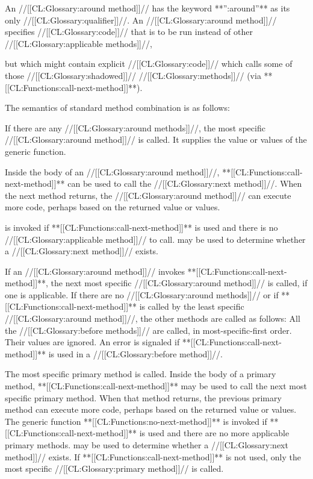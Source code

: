 \itemitem{\bull}
An //[[CL:Glossary:around method]]// has the keyword **'':around''** as its only //[[CL:Glossary:qualifier]]//.
An //[[CL:Glossary:around method]]// specifies //[[CL:Glossary:code]]// that is to be run instead of other
//[[CL:Glossary:applicable methods]]//,


but which might contain explicit //[[CL:Glossary:code]]//
which calls some of those //[[CL:Glossary:shadowed]]// //[[CL:Glossary:methods]]//
(via **[[CL:Functions:call-next-method]]**).

\endlist

The semantics of standard method combination is as follows:

\beginlist
                               
\itemitem{\bull} If there are any //[[CL:Glossary:around methods]]//, the most specific
//[[CL:Glossary:around method]]// is called.  It supplies the value or values of the
generic function.

\itemitem{\bull} Inside the body of an //[[CL:Glossary:around method]]//, 
**[[CL:Functions:call-next-method]]** can be used to call the //[[CL:Glossary:next method]]//.  When the next
method returns, the //[[CL:Glossary:around method]]// can execute more code,
perhaps based on the returned value or values.



 is invoked if **[[CL:Functions:call-next-method]]** is used and
there is no //[[CL:Glossary:applicable method]]// to call.  
may be used to determine whether a //[[CL:Glossary:next method]]// exists.

\itemitem{\bull} 
If an //[[CL:Glossary:around method]]// invokes **[[CL:Functions:call-next-method]]**,
the next most specific //[[CL:Glossary:around method]]//
is called, if one is applicable.  If there are no //[[CL:Glossary:around methods]]// 
or if **[[CL:Functions:call-next-method]]** is called by the least
specific //[[CL:Glossary:around method]]//, the other methods are called as
follows:
\beginlist
\itemitem{--} All the //[[CL:Glossary:before methods]]// are called, in
most-specific-first order.  Their values are ignored.
An error is signaled if **[[CL:Functions:call-next-method]]** is used in a
//[[CL:Glossary:before method]]//.

\itemitem{--} The most specific primary method is called.  Inside the
body of a primary method, **[[CL:Functions:call-next-method]]** may be used to call
the next most specific primary method.  When that method returns, the
previous primary method can execute more code, perhaps based on the
returned value or values.  The generic function **[[CL:Functions:no-next-method]]**
is invoked if **[[CL:Functions:call-next-method]]** is used and there are no more
applicable primary methods.   may be
used to determine whether a //[[CL:Glossary:next method]]// exists.  If **[[CL:Functions:call-next-method]]**
is not used, only the most specific //[[CL:Glossary:primary method]]// is called.

